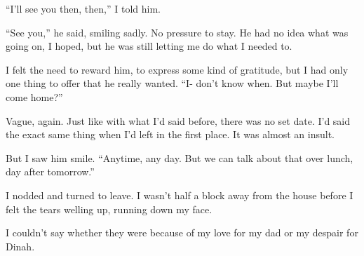 ``I'll see you then, then,'' I told him.



``See you,'' he said, smiling sadly.  No pressure to stay.  He had no idea what was going on, I hoped, but he was still letting me do what I needed to.



I felt the need to reward him, to express some kind of gratitude, but I had only one thing to offer that he really wanted.  ``I-  don't know when.  But maybe I'll come home?''



Vague, again.  Just like with what I'd said before, there was no set date.  I'd said the exact same thing when I'd left in the first place.  It was almost an insult.



But I saw him smile.  ``Anytime, any day.  But we can talk about that over lunch, day after tomorrow.''



I nodded and turned to leave.  I wasn't half a block away from the house before I felt the tears welling up, running down my face.



I couldn't say whether they were because of my love for my dad or my despair for Dinah.





